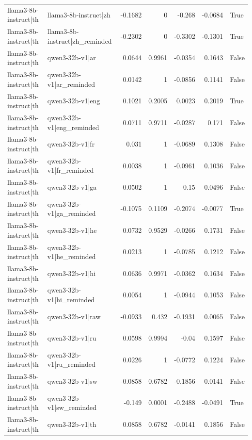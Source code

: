 \begin{table}
\begin{tabular}{l l r r r r l}
llama3-8b-instruct|th & llama3-8b-instruct|zh & -0.1682 & 0 & -0.268 & -0.0684 & True \\
llama3-8b-instruct|th & llama3-8b-instruct|zh_reminded & -0.2302 & 0 & -0.3302 & -0.1301 & True \\
llama3-8b-instruct|th & qwen3-32b-v1|ar & 0.0644 & 0.9961 & -0.0354 & 0.1643 & False \\
llama3-8b-instruct|th & qwen3-32b-v1|ar_reminded & 0.0142 & 1 & -0.0856 & 0.1141 & False \\
llama3-8b-instruct|th & qwen3-32b-v1|eng & 0.1021 & 0.2005 & 0.0023 & 0.2019 & True \\
llama3-8b-instruct|th & qwen3-32b-v1|eng_reminded & 0.0711 & 0.9711 & -0.0287 & 0.171 & False \\
llama3-8b-instruct|th & qwen3-32b-v1|fr & 0.031 & 1 & -0.0689 & 0.1308 & False \\
llama3-8b-instruct|th & qwen3-32b-v1|fr_reminded & 0.0038 & 1 & -0.0961 & 0.1036 & False \\
llama3-8b-instruct|th & qwen3-32b-v1|ga & -0.0502 & 1 & -0.15 & 0.0496 & False \\
llama3-8b-instruct|th & qwen3-32b-v1|ga_reminded & -0.1075 & 0.1109 & -0.2074 & -0.0077 & True \\
llama3-8b-instruct|th & qwen3-32b-v1|he & 0.0732 & 0.9529 & -0.0266 & 0.1731 & False \\
llama3-8b-instruct|th & qwen3-32b-v1|he_reminded & 0.0213 & 1 & -0.0785 & 0.1212 & False \\
llama3-8b-instruct|th & qwen3-32b-v1|hi & 0.0636 & 0.9971 & -0.0362 & 0.1634 & False \\
llama3-8b-instruct|th & qwen3-32b-v1|hi_reminded & 0.0054 & 1 & -0.0944 & 0.1053 & False \\
llama3-8b-instruct|th & qwen3-32b-v1|raw & -0.0933 & 0.432 & -0.1931 & 0.0065 & False \\
llama3-8b-instruct|th & qwen3-32b-v1|ru & 0.0598 & 0.9994 & -0.04 & 0.1597 & False \\
llama3-8b-instruct|th & qwen3-32b-v1|ru_reminded & 0.0226 & 1 & -0.0772 & 0.1224 & False \\
llama3-8b-instruct|th & qwen3-32b-v1|sw & -0.0858 & 0.6782 & -0.1856 & 0.0141 & False \\
llama3-8b-instruct|th & qwen3-32b-v1|sw_reminded & -0.149 & 0.0001 & -0.2488 & -0.0491 & True \\
llama3-8b-instruct|th & qwen3-32b-v1|th & 0.0858 & 0.6782 & -0.0141 & 0.1856 & False \\

\end{tabular}
\end{table}
